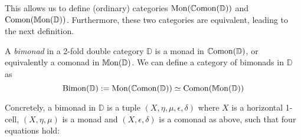 This allows us to define (ordinary) categories $\mathrm{Mon}(\mathbb{C}\mathrm{omon}(\mathbb{D}))$ and $\mathrm{Comon}(\mathbb{M}\mathrm{on}(\mathbb{D}))$. Furthermore, these two categories are equivalent, leading to the next definition.

\begin{definition}\label{Def:Bimonad}
	A \emph{bimonad} in a 2-fold double category $\mathbb{D}$ is a monad in $\mathbb{C}\mathrm{omon}(\mathbb{D})$, or equivalently a comonad in $\mathbb{M}\mathrm{on}(\mathbb{D})$. We can define a category of bimonads in $\mathbb{D}$ as
	\[
		\mathrm{Bimon}(\mathbb{D}) := \mathrm{Mon}(\mathbb{C}\mathrm{omon}(\mathbb{D})) \simeq \mathrm{Comon}(\mathbb{M}\mathrm{on}(\mathbb{D}))
	\]
\end{definition}

Concretely, a bimonad in $\mathbb{D}$ is a tuple $(X,\eta,\mu,\epsilon,\delta)$ where $X$ is a horizontal 1-cell, $(X,\eta,\mu)$ is a monad and $(X,\epsilon,\delta)$ is a comonad as above, such that four equations hold:
